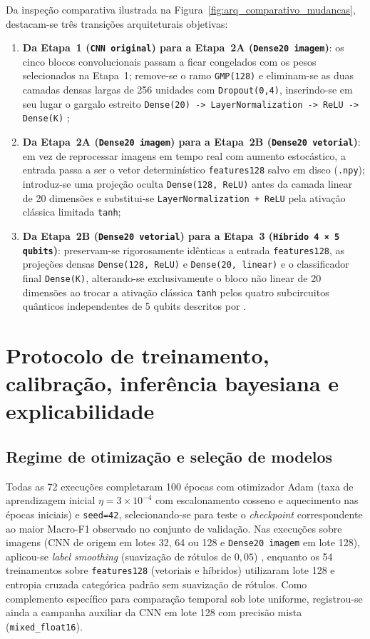 \documentclass[
    12pt,
    openright,
    oneside,
    a4paper,
    english,
    brazil
]{abntex2}
\begin{document}
Da inspeção comparativa ilustrada na Figura~\ref{fig:arq_comparativo_mudancas}, destacam-se três transições arquiteturais objetivas:
\begin{enumerate}
    \item \textbf{Da Etapa~1 (\texttt{CNN original}) para a Etapa~2A (\texttt{Dense20 imagem})}: os cinco blocos convolucionais passam a ficar congelados com os pesos selecionados na Etapa~1; remove-se o ramo \texttt{GMP(128)} e eliminam-se as duas camadas densas largas de 256 unidades com \texttt{Dropout(0,4)}, inserindo-se em seu lugar o gargalo estreito \texttt{Dense(20) -> LayerNormalization -> ReLU -> Dense(K)} \cite{ba2016layernorm};
    \item \textbf{Da Etapa~2A (\texttt{Dense20 imagem}) para a Etapa~2B (\texttt{Dense20 vetorial})}: em vez de reprocessar imagens em tempo real com aumento estocástico, a entrada passa a ser o vetor determinístico \texttt{features128} salvo em disco (\texttt{.npy}); introduz-se uma projeção oculta \texttt{Dense(128, ReLU)} antes da camada linear de 20 dimensões e substitui-se \texttt{LayerNormalization + ReLU} pela ativação clássica limitada \texttt{tanh};
    \item \textbf{Da Etapa~2B (\texttt{Dense20 vetorial}) para a Etapa~3 (\texttt{Híbrido 4 × 5 qubits})}: preservam-se rigorosamente idênticas a entrada \texttt{features128}, as projeções densas \texttt{Dense(128, ReLU)} e \texttt{Dense(20, linear)} e o classificador final \texttt{Dense(K)}, alterando-se exclusivamente o bloco não linear de 20 dimensões ao trocar a ativação clássica \texttt{tanh} pelos quatro subcircuitos quânticos independentes de 5 qubits descritos por .
\end{enumerate}

\section{Protocolo de treinamento, calibração, inferência bayesiana e explicabilidade}

\subsection{Regime de otimização e seleção de modelos}

Todas as 72 execuções completaram 100 épocas com otimizador Adam (taxa de aprendizagem inicial \(\eta = 3 \times 10^{-4}\) com escalonamento cosseno e aquecimento nas épocas iniciais) \cite{kingma2015adam,goodfellow2016deep} e \texttt{seed=42}, selecionando-se para teste o \textit{checkpoint} correspondente ao maior Macro-F1 observado no conjunto de validação. Nas execuções sobre imagens (CNN de origem em lotes 32, 64 ou 128 e \texttt{Dense20 imagem} em lote 128), aplicou-se \textit{label smoothing} (suavização de rótulos de \(0{,}05\)) \cite{goodfellow2016deep}, enquanto os 54 treinamentos sobre \texttt{features128} (vetoriais e híbridos) utilizaram lote 128 e entropia cruzada categórica padrão sem suavização de rótulos. Como complemento específico para comparação temporal sob lote uniforme, registrou-se ainda a campanha auxiliar da CNN em lote 128 com precisão mista (\texttt{mixed\_float16}).
\end{document}
